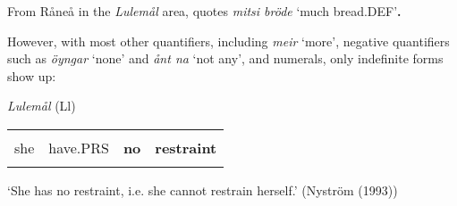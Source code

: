 \begin{styleBodyTextFirst}
From Råneå in the \textit{Lulemål} area, \citet[17]{Delsing2003a} quotes\textbf{ }\textit{mitsi bröde } ‘much bread.DEF’\textbf{. }

\end{styleBodyTextFirst}

\begin{styleBodytextC}
However, with most other quantifiers, including \textit{meir} ‘more’, negative quantifiers such as \textit{öyngar} ‘none’ and \textit{ånt na} ‘not any’, and numerals, only indefinite forms show up:

\end{styleBodytextC}

\begin{listWWNumileveli}
\item {}

\begin{styleExample}
\textit{Lulemål} (Ll) 

\end{styleExample}

\end{listWWNumileveli}

\begin{listWWNumxxxvileveli}
\item {}

\end{listWWNumxxxvileveli}

\begin{tabular}{llll}
\lsptoprule
\multicolumn{4}{l}{Ho

}\\
she & have.PRS & {\bfseries no} & {\bfseries restraint}\\
\lspbottomrule
\end{tabular}

\begin{styleTranslation}
‘She has no restraint, i.e. she cannot restrain herself.’ (Nyström (1993))

\end{styleTranslation}

